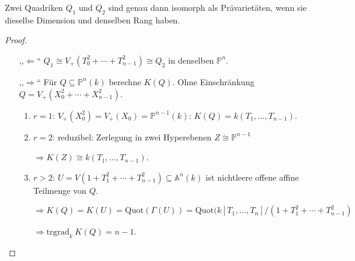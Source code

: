 \begin{cor}[orig. 61]
  Zwei Quadriken $Q_{1}$ und $Q_{2}$ sind genau dann isomorph als
  Prävarietäten, wenn sie dieselbe Dimension und denselben Rang haben.
\end{cor}
\begin{proof}
  \mbox{}
  \begin{itemize}
  \item[,,$\Leftarrow$``]
    $Q_{1}\cong V_{+}(T_{0}^{2}+\cdots+T_{n-1}^{2})\cong Q_{2}$ in
    denselben $\mathbb{P}^{n}$.
  \item[,,$\Rightarrow$``] Für $Q\subseteq\mathbb{P}^{n}(k)$ berechne
    $K(Q)$. Ohne Einschränkung
    $Q=V_{+}(X_{0}^{2}+\cdots+X_{n-1}^{2})$.
    \begin{enumerate}
    \item $r=1$: $V_{+}(X_{0}^{2})=V_{+}(X_{0})=\mathbb{P}^{n-1}(k)$:
      $K(Q)=k(T_{1},\ldots,T_{n-1})$.
    \item $r=2$: reduzibel: Zerlegung in zwei Hyperebenen
      $Z\cong\mathbb{P}^{n-1}$

      $\Rightarrow K(Z)\cong k(T_{1},\ldots,T_{n-1})$.
    \item $r>2$:
      $U=V(1+T_{1}^{2}+\cdots+T_{n-1}^{2})\subseteq\mathbb{A}^{n}(k)$
      ist nichtleere offene affine Teilmenge von $Q$.

      $\Rightarrow K(Q)=K(U)=\text{Quot}(\Gamma(U))=\text{Quot}(k[T_{1},\ldots,T_{n}]/(1+T_{1}^{2}+\cdots+T_{n-1}^{2})$

      $\Rightarrow\text{trgrad}_{k}\ K(Q)=n-1$. 
    \end{enumerate}
  \end{itemize}
\end{proof}
